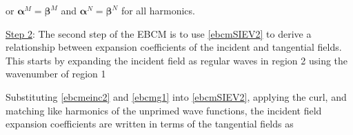 

\noindent or $\boldsymbol{\alpha}^M = \boldsymbol{\beta}^M$ and $\boldsymbol{\alpha}^N = \boldsymbol{\beta}^N$ for all harmonics.  


\underline{Step 2}: The second step of the EBCM is to use \eqref{ebcmSIEV2} to derive a relationship between expansion coefficients of the incident and tangential fields. This starts by expanding the incident field as regular waves in region 2 using the wavenumber of region 1
 
Substituting \eqref{ebcmeinc2} and \eqref{ebcmg1} into \eqref{ebcmSIEV2}, applying the curl, and matching like harmonics of the unprimed wave functions, the incident field expansion coefficients are written in terms of the tangential fields as

